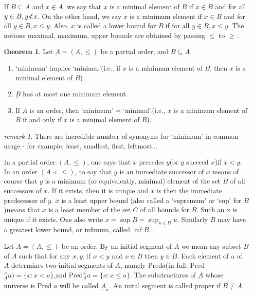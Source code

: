 \documentclass[a4paper,11pt]{article}%
\theoremstyle{remark}
\newtheorem*{remark}{remark}
\theoremstyle{definition}
\newtheorem{theorem}{theorem}[section]
\theoremstyle{definition}
\theoremstyle{plain}
\theoremstyle{definition}
\begin{document}
If $B\subseteq A$ and $x\in A$, we say that $x$ is a minimal element of $B$ if $x\in B$
and for all $y\in B,y\slashed{<}x$. On the other hand, we say $x$ is a minimum
element if $x\in B$ and for all $y\in B,x\leq y$. Also, $x$ is called a lower bound for $B$
if for all $y\in B,x\leq y$. The notions maximal, maximum, upper bounde are obtained by passing 
$\leq$ to $\geq$.
\begin{theorem}
    Let $\underbar{A}=(A,\leq)$ be a partial order, and $B\subseteq A$.
    \begin{enumerate}
        \item `minimum' implies `minimal'(i.e., if $x$ is a minimum element of $B$, then $x$ is a minimal element of $B$)
        \item $\underbar{B}$ has at most one minimum element.
        \item If $\underbar{A}$ is an order, then `minimum' = `minimal'.(i.e., $x$ is a minimum element of $B$ if and only if $x$ is a minimal element of $B$).
    \end{enumerate}
\end{theorem}
\begin{remark}
    There are incredible number of synonyms for `minimum' in common usage - 
    for example, least, smallest, first, leftmost...
\end{remark}
In a partial order $(A,\leq)$, one says that $x$ precedes $y$(or $y$ succeed $x$)if $x<y$.
In an order $(A<\leq)$, to say that $y$ is an immediate successor of $x$ means of course that $y$ is a 
minimum (or equivalently, minimal) element of the set $B$ of all successors of $x$.
If it exists, then it is unique and $x$ is then the immediate predecessor of $y$.
$x$ is a least upper bound (also called a `supremum' or  `sup' for $B$ )means that 
$x$ is a least member of the set $C$ of all bounds for $B$. Such an x is unique if it exists. One also write
$x=\sup B=\sup_{u\in B}u$. Similarly $B$ may have a greatest lower bound, or infimum, called $\inf B.$

Let $\underbar{A}=(A,\leq)$ be an order. By an initial segment of $\underbar{A}$ we mean any subset
$B$ of $A$ such that for any $x,y$, if $x<y$ and $x\in B$ then $y\in B$. Each element of a of $A$
determines two initial segments of $\underbar{A}$, namely Pred$a$(in full, Pred $^{<}_{\underbar{A}}a)=\{x:x< a\}$,and Pred$^{\leq}_{\underbar{A}}a=\{x:x\leq a\}$.
The substructures of $\underbar{A}$ whose universe is Pred $a$ will be called $\underbar{A}_a$. An inital segment is 
called proper if $B\neq A$. 
\end{document}
